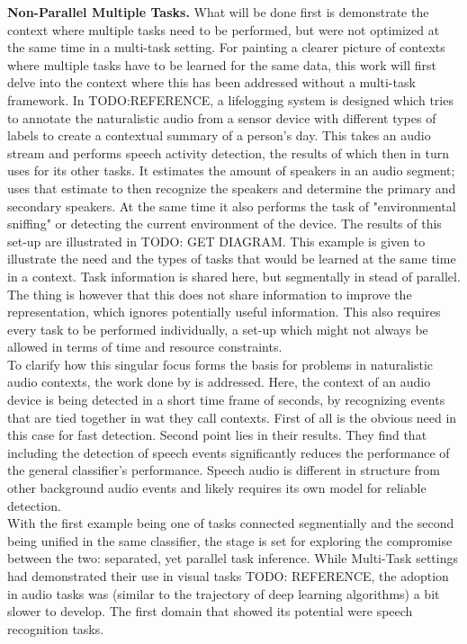 \textbf{Non-Parallel Multiple Tasks.} What will be done first is demonstrate the context where multiple tasks need to be performed, but were not optimized at the same time in a multi-task setting. For painting a clearer picture of contexts where multiple tasks have to be learned for the same data, this work will first delve into the context where this has been addressed without a multi-task framework. In TODO:REFERENCE, a lifelogging system is designed which tries to annotate the naturalistic audio from a sensor device with different types of labels to create a contextual summary of a person's day. This takes an audio stream and performs speech activity detection, the results of which then in turn uses for its other tasks. It estimates the amount of speakers in an audio segment; uses that estimate to then recognize the speakers and determine the primary and secondary speakers. At the same time it also performs the task of "environmental sniffing" or detecting the current environment of the device. The results of this set-up are illustrated in TODO: GET DIAGRAM. This example is given to illustrate the need and the types of tasks that would be learned at the same time in a context. Task information is shared here, but segmentally in stead of parallel. The thing is however that this does not share information to improve the representation, which ignores potentially useful information. This also requires every task to be performed individually, a set-up which might not always be allowed in terms of time and resource constraints.\\

To clarify how this singular focus forms the basis for problems in naturalistic audio contexts, the work done by \cite{park2020augmenting} is addressed. Here, the context of an audio device is being detected in a short time frame of seconds, by recognizing events that are tied together in wat they call contexts. First of all is the obvious need in this case for fast detection. Second point lies in their results. They find that including the detection of speech events significantly reduces the performance of the general classifier's performance. Speech audio is different in structure from other background audio events and likely requires its own model for reliable detection.\\

With the first example being one of tasks connected segmentially and the second being unified in the same classifier, the stage is set for exploring the compromise between the two: separated, yet parallel task inference. While Multi-Task settings had demonstrated their use in visual tasks TODO: REFERENCE, the adoption in audio tasks was (similar to the trajectory of deep learning algorithms) a bit slower to develop. The first domain that showed its potential were speech recognition tasks.\\


